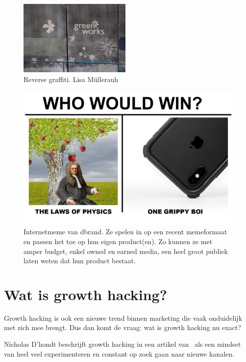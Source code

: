 \begin{figure}[h!]
	\includegraphics[width=55mm]{img/reverse-graffiti.jpg}
	\centering
	\caption{Reverse graffiti. \textcopyright  Lisa Müllerauh}
	\label{fig:defGrowthHacker}
\end{figure}

\begin{figure}[h!]
	\includegraphics[width=\linewidth]{img/dbrand-internetmeme.jpg}
	\centering
	\caption{Internetmeme van dbrand. Ze spelen in op een recent memeformaat en passen het toe op hun eigen product(en). Zo kunnen ze met amper budget, enkel owned en earned media, een heel groot publiek laten weten dat hun product bestaat.}
	\label{fig:defGrowthHacker}
\end{figure}

\section{Wat is growth hacking?}
\label{sec:wat-is-growth-hacking}
Growth hacking is ook een nieuwe trend binnen marketing die vaak onduidelijk met zich mee brengt. Dus dan komt de vraag: wat is growth hacking nu exact?

Nicholas D’hondt beschrijft growth hacking in een artikel van~\textcite{Birdhouse2019} als een mindset van heel veel experimenteren en constant op zoek gaan naar nieuwe kanalen. 

